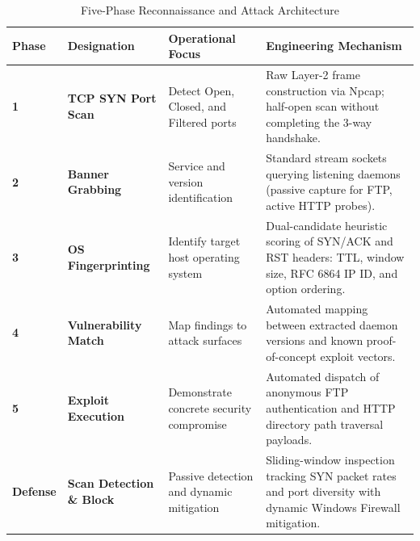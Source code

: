 \documentclass[11pt,a4paper]{article}
\begin{document}
\begin{table}[H]
\centering
\footnotesize
\renewcommand{\arraystretch}{1.0}
\caption{Five-Phase Reconnaissance and Attack Architecture}
\label{tab:phases}
\begin{tabularx}{\textwidth}{>{\centering\arraybackslash\bfseries}p{1.2cm} >{\raggedright\arraybackslash\bfseries}p{2.7cm} >{\raggedright\arraybackslash}p{3.2cm} >{\raggedright\arraybackslash}X}
\toprule
\textbf{Phase} & \textbf{Designation} & \textbf{Operational Focus} & \textbf{Engineering Mechanism} \\
\midrule
1 & TCP SYN Port Scan & Detect Open, Closed, and Filtered ports & Raw Layer-2 frame construction via Npcap; half-open scan without completing the 3-way handshake. \\
\rowcolor{lightbg}
2 & Banner Grabbing & Service and version identification & Standard stream sockets querying listening daemons (passive capture for FTP, active HTTP probes). \\
3 & OS Fingerprinting & Identify target host operating system & Dual-candidate heuristic scoring of SYN/ACK and RST headers: TTL, window size, RFC 6864 IP ID, and option ordering. \\
\rowcolor{lightbg}
4 & Vulnerability Match & Map findings to attack surfaces & Automated mapping between extracted daemon versions and known proof-of-concept exploit vectors. \\
5 & Exploit Execution & Demonstrate concrete security compromise & Automated dispatch of anonymous FTP authentication and HTTP directory path traversal payloads. \\
\midrule
\textbf{Defense} & \textbf{Scan Detection \& Block} & Passive detection and dynamic mitigation & Sliding-window inspection tracking SYN packet rates and port diversity with dynamic Windows Firewall mitigation. \\
\bottomrule
\end{tabularx}
\end{table}
\vspace{-4pt}
\end{document}
